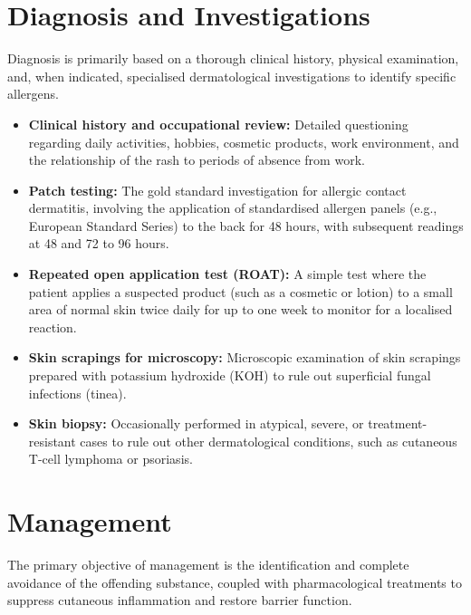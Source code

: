 \section*{Diagnosis and Investigations}
Diagnosis is primarily based on a thorough clinical history, physical examination, and, when indicated, specialised dermatological investigations to identify specific allergens.

\begin{itemize}
    \item \textbf{Clinical history and occupational review:} Detailed questioning regarding daily activities, hobbies, cosmetic products, work environment, and the relationship of the rash to periods of absence from work.
    \item \textbf{Patch testing:} The gold standard investigation for allergic contact dermatitis, involving the application of standardised allergen panels (e.g., European Standard Series) to the back for 48 hours, with subsequent readings at 48 and 72 to 96 hours.
    \item \textbf{Repeated open application test (ROAT):} A simple test where the patient applies a suspected product (such as a cosmetic or lotion) to a small area of normal skin twice daily for up to one week to monitor for a localised reaction.
    \item \textbf{Skin scrapings for microscopy:} Microscopic examination of skin scrapings prepared with potassium hydroxide (KOH) to rule out superficial fungal infections (tinea).
    \item \textbf{Skin biopsy:} Occasionally performed in atypical, severe, or treatment-resistant cases to rule out other dermatological conditions, such as cutaneous T-cell lymphoma or psoriasis.
\end{itemize}

\section*{Management}
The primary objective of management is the identification and complete avoidance of the offending substance, coupled with pharmacological treatments to suppress cutaneous inflammation and restore barrier function.

